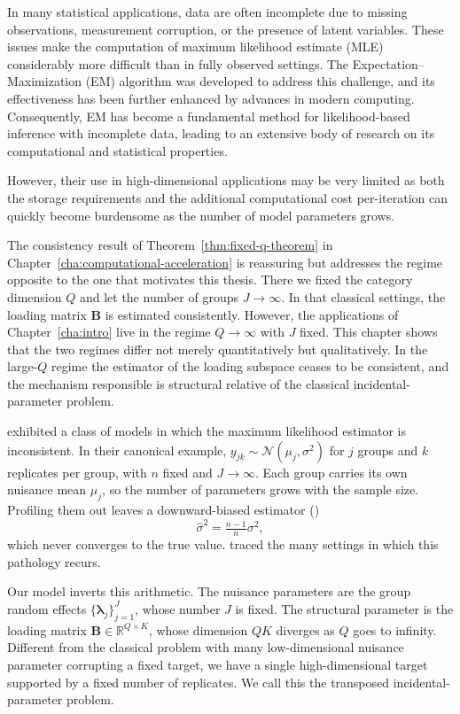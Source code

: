 In many statistical applications, data are often incomplete due to missing observations, measurement corruption, or the presence of latent variables. These issues make the computation of maximum likelihood estimate (MLE) considerably more difficult than in fully observed settings. The Expectation–Maximization (EM) algorithm was developed to address this challenge, and its effectiveness has been further enhanced by advances in modern computing. Consequently, EM has become a fundamental method for likelihood-based inference with incomplete data, leading to an extensive body of research on its computational and statistical properties. 

However, their use in high-dimensional applications  may be very limited as both the storage requirements and the additional computational cost per-iteration can quickly become burdensome as the number of model parameters grows. 

The consistency result of Theorem~\ref{thm:fixed-q-theorem} in Chapter~\ref{cha:computational-acceleration} is reassuring but addresses the regime opposite to the one that motivates this thesis. There we fixed the category dimension $Q$ and let the number of groups $J\to\infty$. In that classical settings, the loading matrix $\mathbf{B}$ is estimated consistently. However, the applications of Chapter~\ref{cha:intro} live in the regime $Q\to\infty$ with $J$ fixed. This chapter shows that the two regimes differ not merely quantitatively but qualitatively. In the large-$Q$ regime the estimator of the loading subspace ceases to be consistent, and the mechanism responsible is structural relative of the classical incidental-parameter problem.

\citet{https://www.jstor.org/stable/1914288} exhibited a class of models in which the maximum likelihood estimator is inconsistent. In their canonical example, $y_{jk}\sim \mathcal{N}(\mu_{j},\sigma^{2})$ for $j$ groups and $k$ replicates per group, with $n$ fixed and $J\to\infty$. Each group carries its own nuisance mean $\mu_{j}$, so the number of parameters grows with the sample size. Profiling them out leaves a downward-biased estimator (\cite{Amari2016}) 
\begin{equation}
    \hat{\sigma}^2 = \tfrac{n-1}{n}\sigma^2,
    \label{eq:downward-biased-estimator}
\end{equation}
which never converges to the true value. \citet{LANCASTER2000391} traced the many settings in which this pathology recurs. 

Our model inverts this arithmetic. The nuisance parameters are the group random effects  $\{\bm{\lambda}_j\}_{j=1}^{J}$, whose number $J$ is fixed. The structural parameter is the loading matrix $\mathbf{B} \in \mathbb{R}^{Q\times K}$, whose dimension $QK$ diverges as $Q$ goes to infinity. Different from the classical problem with many low-dimensional nuisance parameter corrupting a fixed target, we have a single high-dimensional target supported by a fixed number of replicates. We call this the transposed incidental-parameter problem.

